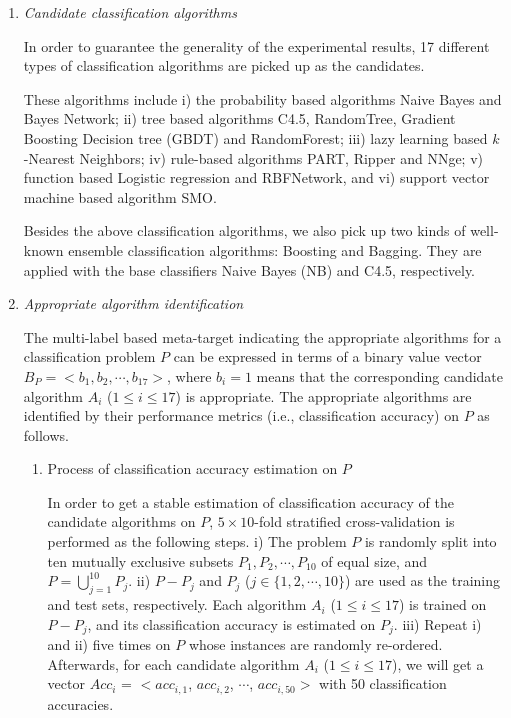 \documentclass[acmsmall]{acmart}
\begin{document}
\begin{enumerate}
	\item \emph{Candidate classification algorithms}
	
	In order to guarantee the generality of the experimental
	results, 17 different types of classification algorithms are picked up
	as the candidates.
	
	\quad These algorithms include i) the probability based algorithms Naive Bayes and Bayes Network;
	ii) tree based algorithms C4.5, RandomTree, Gradient Boosting Decision tree (GBDT) and RandomForest; iii) lazy learning based $k$-Nearest Neighbors; iv)
	rule-based algorithms PART, Ripper and NNge; v) function based Logistic regression and RBFNetwork, and vi) support vector machine based algorithm SMO.
	
	\quad Besides the above classification algorithms, we also pick up two kinds of well-known
	ensemble classification algorithms: Boosting and Bagging. They are applied with the base
	classifiers Naive Bayes (NB) and C4.5, respectively.
	
	\item \emph{Appropriate algorithm identification}
	
	The multi-label based meta-target indicating the appropriate algorithms for a classification
	problem $P$ can be expressed in terms of a binary value vector $B_{P} = <b_1, b_2,
	\cdots, b_{17}>$, where $b_i = 1$ means that the corresponding candidate
	algorithm $A_i$ ($1\leq i\leq 17$) is appropriate. The appropriate algorithms are
	identified by their performance metrics (i.e., classification accuracy) on $P$ as follows.
	
	\begin{enumerate}
		\item {Process of classification accuracy estimation on $P$}
		
		In order to get a stable estimation of classification accuracy of
		the candidate algorithms on $P$, $5\times10$-fold stratified cross-validation is performed as
		the following steps. i) The problem $P$ is randomly split into ten mutually
		exclusive subsets $P_1, P_2, \cdots, P_{10}$ of equal size, and
		$P = \bigcup_{j=1}^{10} P_j$. ii) $P - P_j$ and $P_j$ ($j \in
		\{1,2,\cdots,10\}$) are used as the training and test sets, respectively.
		Each algorithm $A_i$ ($1\leq i \leq 17$)
		is trained on $P - P_j$, and its classification
		accuracy is estimated on $P_j$. iii) Repeat i) and ii) five times
		on $P$ whose instances are randomly re-ordered. Afterwards,
		for each candidate algorithm $A_i$ ($1\leq i \leq 17$),
		we will get a vector $Acc_i$ = $<acc_{i,1}$, $acc_{i,2}$,
		$\cdots$, $acc_{i,50}>$ with 50 classification accuracies.
		

\end{enumerate}
\end{enumerate}
\end{document}
